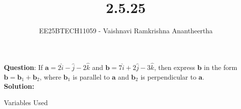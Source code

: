 \documentclass[journal]{IEEEtran}
\title{2.5.25}
\author{EE25BTECH11059 - Vaishnavi Ramkrishna Anantheertha}
\begin{document}
\maketitle

\renewcommand{\thefigure}{\theenumi}
\renewcommand{\thetable}{\theenumi}


\textbf{Question}:
If $\mathbf{a} = 2\hat{i} - \hat{j} - 2\hat{k}$ and $\mathbf{b} = 7\hat{i} + 2\hat{j} - 3\hat{k}$, then express $\mathbf{b}$ in the form $\mathbf{b} = \mathbf{b}_1 + \mathbf{b}_2$, where $\mathbf{b}_1$ is parallel to $\mathbf{a}$ and $\mathbf{b}_2$ is perpendicular to $\mathbf{a}$.
\\
\textbf{Solution: }\\
\begin{table}[H]    
  \centering
  
  \caption{Variables Used}
  \label{tab:1.10.25}
\end{table}
\end{document}
